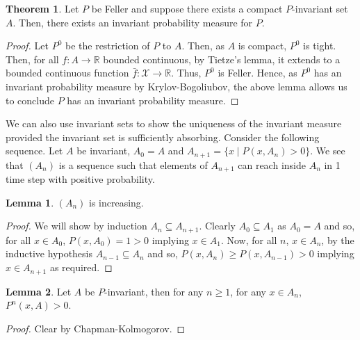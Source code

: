\documentclass[]{article}
\theoremstyle{definition}
\newtheorem{theorem}{Theorem}
\theoremstyle{definition}
\newtheorem{lemma}{Lemma}[section]
\begin{document}
\begin{theorem}
  Let \(P\) be Feller and suppose there exists a compact \(P\)-invariant set 
  \(A\). Then, there exists an invariant probability measure for \(P\).
\end{theorem}
\begin{proof}
  Let \(P^0\) be the restriction of \(P\) to \(A\). Then, as \(A\) is compact, 
  \(P^0\) is tight. Then, for all \(f : A \to \mathbb{R}\) bounded continuous, 
  by Tietze's lemma, it extends to a bounded continuous function 
  \(\bar f : \mathcal{X}\to \mathbb{R}\). Thus, \(P^0\) is Feller. Hence, 
  as \(P^0\) has an invariant probability measure by Krylov-Bogoliubov,
  the above lemma allows us to conclude \(P\) has an invariant probability
  measure.
\end{proof}

We can also use invariant sets to show the uniqueness of the invariant measure 
provided the invariant set is sufficiently absorbing. Consider the following 
sequence. Let \(A\) be invariant, \(A_0 = A\) and 
\(A_{n + 1} = \{x \mid P(x, A_n) > 0\}\). We see that \((A_n)\) is a sequence 
such that elements of \(A_{n + 1}\) can reach inside \(A_n\) in 1 time step 
with positive probability.

\begin{lemma}
  \((A_n)\) is increasing.
\end{lemma}
\begin{proof}
  We will show by induction \(A_n \subseteq A_{n + 1}\). Clearly 
  \(A_0 \subseteq A_1\) as \(A_0 = A\) and so, for all \(x \in A_0\), 
  \(P(x, A_0) = 1 > 0\) implying \(x \in A_1\). Now, for all \(n\), 
  \(x \in A_n\), by the inductive hypothesis \(A_{n - 1} \subseteq A_n\) and 
  so, \(P(x, A_n) \ge P(x, A_{n - 1}) > 0\) implying \(x \in A_{n + 1}\) as 
  required.
\end{proof}

\begin{lemma}
  Let \(A\) be \(P\)-invariant, then for any \(n \ge 1\), for any \(x \in A_n\), 
  \(P^n(x, A) > 0\).
\end{lemma}
\begin{proof}
  Clear by Chapman-Kolmogorov.
\end{proof}
\end{document}
